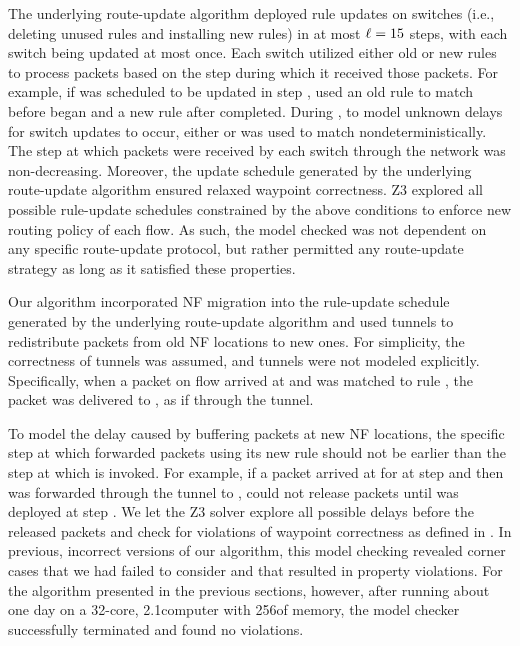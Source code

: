 The underlying route-update algorithm deployed rule updates on
switches (i.e., deleting unused rules and installing new rules) in at
most $\mathit{\ell} = 15$ steps, with each switch being updated at most
once.  Each switch utilized either old or new rules to process packets
based on the step during which it received those packets. For example,
if  was scheduled to be updated in step ,
 used an old rule  to match  before
 began and a new rule  after 
completed.  During , to model unknown delays for switch
updates to occur, either  or  was used to match
 nondeterministically. The step at which packets were
received by each switch through the network was non-decreasing.
Moreover, the update schedule generated by the underlying route-update
algorithm ensured relaxed waypoint correctness.  Z3 explored all
possible rule-update schedules constrained by the above conditions to
enforce new routing policy of each flow.  As such, the model checked
was not dependent on any specific route-update protocol, but rather
permitted any route-update strategy as long as it satisfied these
properties.

Our algorithm incorporated NF migration into the rule-update schedule
generated by the underlying route-update algorithm and used tunnels to
redistribute packets from old NF locations to new ones. For
simplicity, the correctness of tunnels was assumed, and tunnels were
not modeled explicitly.  Specifically, when a packet on flow \flowID{}
arrived at \oldSwitchID{\nfIdx} and was matched to rule
, the packet was delivered to \newSwitchID{\nfIdx},
as if through the tunnel.

To model the delay caused by buffering packets at new NF locations,
the specific step at which \newSwitchID{\nfIdx} forwarded packets
using its new rule should not be earlier than the step at which
\newSwitchID{\nfIdx}{\release{\nfIdx}} is invoked. For example, if a
packet arrived at \oldSwitchID{\nfIdx} for \nfID{\nfIdx} at step
 and then was forwarded through the tunnel to
\newSwitchID{\nfIdx}, \newSwitchID{\nfIdx} could not release packets
until \newSwitchID{\nfIdx}{\release{\nfIdx}} was deployed at step
. We let the Z3 solver explore all possible delays before
the \newSwitchID{\nfIdx} released packets and check for violations of
waypoint correctness as defined in .  In
previous, incorrect versions of our algorithm, this model checking
revealed corner cases that we had failed to consider and that resulted
in property violations.  For the algorithm presented in the previous
sections, however, after running about one day on a 32-core,
2.1\gigahertz computer with 256\gigabytes of memory, the model checker
successfully terminated and found no violations.

